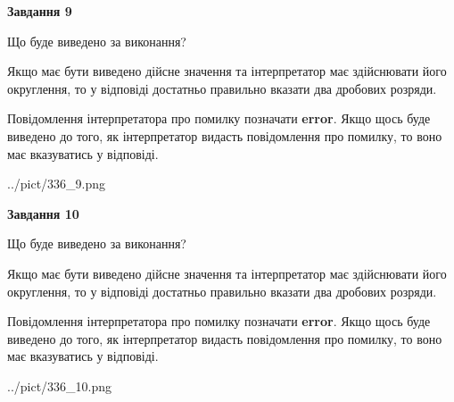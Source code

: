 \documentclass[12pt, ukrainian]{article}
\begin{document}
{\begin {Large}
{\begin {center}\textbf{Завдання 9}\end {center}}\par
Що буде виведено за виконання? \par

Якщо має бути виведено дійсне значення та інтерпретатор має здійснювати його округлення, 
то у відповіді достатньо правильно вказати два дробових розряди.

Повідомлення інтерпретатора про помилку позначати \textbf{error}.
Якщо щось буде виведено до того, як інтерпретатор видасть повідомлення про помилку, 
то воно має вказуватись у відповіді. \par

\begin{center}
	{../pict/336_9.png}
\end{center}
\newpage

{\begin {center}\textbf{Завдання 10}\end {center}}\par
Що буде виведено за виконання? \par

Якщо має бути виведено дійсне значення та інтерпретатор має здійснювати його округлення, 
то у відповіді достатньо правильно вказати два дробових розряди.

Повідомлення інтерпретатора про помилку позначати \textbf{error}.
Якщо щось буде виведено до того, як інтерпретатор видасть повідомлення про помилку, 
то воно має вказуватись у відповіді. \par

\begin{center}
	{../pict/336_10.png}
\end{center}
\newpage

\end {Large}}
\end{document}
